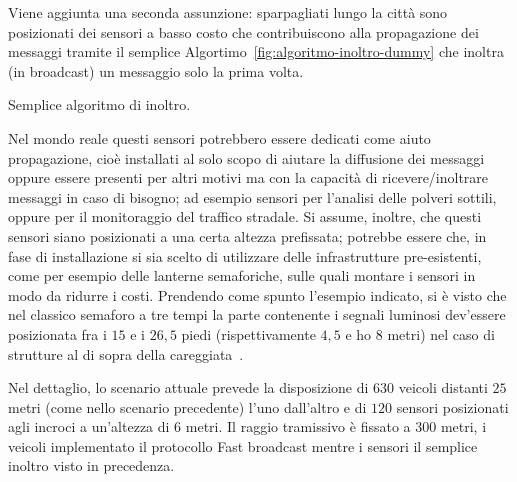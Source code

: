 Viene aggiunta una seconda assunzione: sparpagliati lungo la città sono posizionati dei sensori a basso costo
che contribuiscono alla propagazione dei messaggi tramite il semplice Algortimo~\ref{fig:algoritmo-inoltro-dummy}
che inoltra (in broadcast) un messaggio solo la prima volta.
%
\begin{italianalgorithm}[h]
\begin{algorithmic}[1]
		\EndIf{}
\end{algorithmic}
\caption{Semplice algoritmo di inoltro.}\label{fig:algoritmo-inoltro-dummy}
\end{italianalgorithm}
%
Nel mondo reale questi sensori potrebbero essere dedicati come aiuto propagazione,
cioè installati al solo scopo di aiutare la diffusione dei messaggi
oppure essere presenti per altri motivi ma con la capacità di ricevere/inoltrare messaggi
in caso di bisogno; ad esempio sensori per l'analisi delle polveri sottili,
oppure per il monitoraggio del traffico stradale.
Si assume, inoltre, che questi sensori siano posizionati a una certa altezza prefissata;
potrebbe essere che, in fase di installazione si sia scelto di utilizzare delle infrastrutture
pre-esistenti, come per esempio delle lanterne semaforiche, sulle quali montare i sensori in modo da ridurre i costi.
Prendendo come spunto l'esempio indicato, si è visto che nel classico semaforo a tre tempi
la parte contenente i segnali luminosi dev'essere posizionata
fra i $15$ e i $26,5$ piedi (rispettivamente $4,5$ e ho $8$ metri) nel caso di strutture al di sopra della
careggiata~\cite{MUTCD}.

Nel dettaglio, lo scenario attuale prevede la disposizione di $630$ veicoli distanti
$25$ metri (come nello scenario precedente) l'uno dall'altro
e di $120$ sensori posizionati agli incroci a un'altezza di $6$ metri.
Il raggio tramissivo è fissato a $300$ metri, i veicoli implementato il protocollo Fast broadcast
mentre i sensori il semplice inoltro visto in precedenza.

